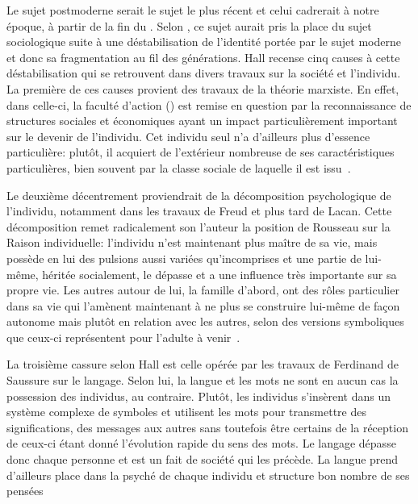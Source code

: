 Le sujet postmoderne serait le sujet le plus récent et celui cadrerait à notre époque, à partir de la fin du . 
Selon \citeauthor{Hall1996a}, ce sujet aurait pris la place du sujet sociologique suite à une déstabilisation de l'identité portée par le sujet moderne et donc sa fragmentation au fil des générations. 
Hall recense cinq causes à cette déstabilisation qui se retrouvent dans divers travaux sur la société et l'individu. 
La première de ces causes provient des travaux de la théorie marxiste. 
En effet, dans celle-ci, la faculté d'action () est remise en question par la reconnaissance de structures sociales et économiques ayant un impact particulièrement important sur le devenir de l'individu. 
Cet individu seul n'a d'ailleurs plus d'essence particulière: plutôt, il acquiert de l'extérieur nombreuse de ses caractéristiques particulières, bien souvent par la classe sociale de laquelle il est issu~\citeyearpar[606]{Hall1996a}.

Le deuxième décentrement proviendrait de la décomposition psychologique de l'individu, notamment dans les travaux de Freud et plus tard de Lacan. 
Cette décomposition remet radicalement son l'auteur la position de Rousseau sur la Raison individuelle: l'individu n'est maintenant plus maître de sa vie, mais possède en lui des pulsions aussi variées qu'incomprises et une partie de lui-même, héritée socialement, le dépasse et a une influence très importante sur sa propre vie. 
Les autres autour de lui, la famille d'abord, ont des rôles particulier dans sa vie qui l'amènent maintenant à ne plus se construire lui-même de façon autonome mais plutôt en relation avec les autres, selon des versions symboliques que ceux-ci représentent pour l'adulte à venir~\citeyearpar[ 607--608]{Hall1996a}.

La troisième cassure selon Hall est celle opérée par les travaux de Ferdinand de Saussure sur le langage. 
Selon lui, la langue et les mots ne sont en aucun cas la possession des individus, au contraire. 
Plutôt, les individus s'insèrent dans un système complexe de symboles et utilisent les mots pour transmettre des significations, des messages aux autres sans toutefois être certains de la réception de ceux-ci étant donné l'évolution rapide du sens des mots. 
Le langage dépasse donc chaque personne et est un fait de société qui les précède. 
La langue prend d'ailleurs place dans la psyché de chaque individu et structure bon nombre de ses pensées~\citeyearpar[608--609]{Hall1996a}

